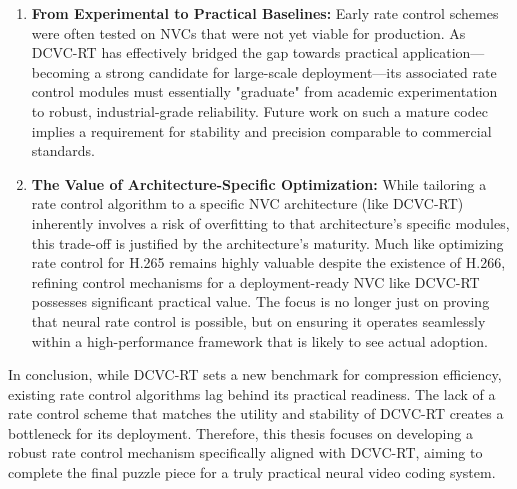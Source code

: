 \begin{enumerate}
    \item \textbf{From Experimental to Practical Baselines:} 
    Early rate control schemes were often tested on NVCs that were not yet viable for production. As DCVC-RT has effectively bridged the gap towards practical application—becoming a strong candidate for large-scale deployment—its associated rate control modules must essentially "graduate" from academic experimentation to robust, industrial-grade reliability. Future work on such a mature codec implies a requirement for stability and precision comparable to commercial standards.

    \item \textbf{The Value of Architecture-Specific Optimization:} 
    While tailoring a rate control algorithm to a specific NVC architecture (like DCVC-RT) inherently involves a risk of overfitting to that architecture's specific modules, this trade-off is justified by the architecture's maturity. Much like optimizing rate control for H.265 remains highly valuable despite the existence of H.266, refining control mechanisms for a deployment-ready NVC like DCVC-RT possesses significant practical value. The focus is no longer just on proving that neural rate control is possible, but on ensuring it operates seamlessly within a high-performance framework that is likely to see actual adoption.
\end{enumerate}

In conclusion, while DCVC-RT sets a new benchmark for compression efficiency, existing rate control algorithms lag behind its practical readiness. The lack of a rate control scheme that matches the utility and stability of DCVC-RT creates a bottleneck for its deployment. Therefore, this thesis focuses on developing a robust rate control mechanism specifically aligned with DCVC-RT, aiming to complete the final puzzle piece for a truly practical neural video coding system.